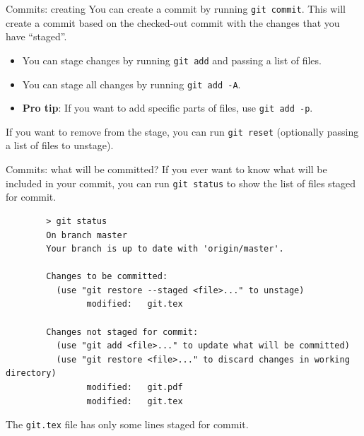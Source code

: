 \documentclass{beeper}
\begin{document}
\begin{frame}{Commits: creating}
    You can create a commit by running \texttt{git commit}. This will create a
    commit based on the checked-out commit with the changes that you have
    ``staged''.
    \pause

    \begin{itemize}[<+->]
        \item You can stage changes by running \texttt{git add} and passing a
            list of files.
        \item You can stage all changes by running \texttt{git add -A}.
        \item \textbf{Pro tip}: If you want to add specific parts of files, use
            \texttt{git add -p}.
    \end{itemize}

    \pause[\thebeamerpauses]
    If you want to remove from the stage, you can run \texttt{git reset}
    (optionally passing a list of files to unstage).
\end{frame}

\begin{frame}[fragile]{Commits: what will be committed?}
    If you ever want to know what will be included in your commit, you can run
    \texttt{git status} to show the list of files staged for commit.
    \pause

    {
        \tiny
        \begin{verbatim}
        > git status
        On branch master
        Your branch is up to date with 'origin/master'.

        Changes to be committed:
          (use "git restore --staged <file>..." to unstage)
                modified:   git.tex

        Changes not staged for commit:
          (use "git add <file>..." to update what will be committed)
          (use "git restore <file>..." to discard changes in working directory)
                modified:   git.pdf
                modified:   git.tex
        \end{verbatim}
    }

    \pause
    The \texttt{git.tex} file has only some lines staged for commit.
\end{frame}
\end{document}
